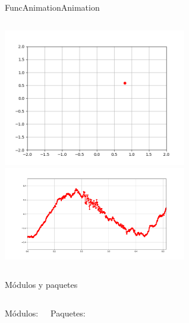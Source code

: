  \begin{frame}{FuncAnimation}{Animation}
    \begin{columns}
       
       \center\includegraphics[width=0.6\textwidth]{python/euler1}
       \center\includegraphics[width=0.6\textwidth]{python/visualize}
    \end{columns}
    \vfill
 \end{frame}
 \begin{frame}{Módulos y paquetes}
    \begin{columns}
       Módulos:
       
       Paquetes:
       
    \end{columns}
    \vfill
 \end{frame}



